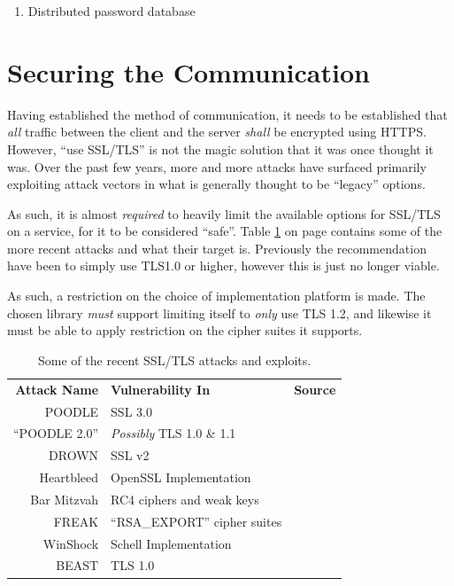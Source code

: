 			\vspace{-3ex}\begin{enumerate}
				\setlength\itemsep{0.1em}
				\item Distributed password database
			\end{enumerate}

	\section{Securing the Communication}
		Having established the method of communication, it needs to be established that \emph{all} traffic between the client and the server \emph{shall} be encrypted using HTTPS. However, ``use SSL/TLS'' is not the magic solution that it was once thought it was. Over the past few years, more and more attacks have surfaced primarily exploiting attack vectors in what is generally thought to be ``legacy'' options.

		As such, it is almost \emph{required} to heavily limit the available options for SSL/TLS on a service, for it to be considered ``safe''. Table \ref{table:ssl/tls} on page \pageref{table:ssl/tls} contains some of the more recent attacks and what their target is. Previously the recommendation have been to simply use TLS1.0 or higher\cite{ms_tls1.0+}, however this is just no longer viable. 

		As such, a restriction on the choice of implementation platform is made. The chosen library \emph{must} support limiting itself to \emph{only} use TLS 1.2, and likewise it must be able to apply restriction on the cipher suites it supports.

		\begin{table}
			\begin{tabular}{r | l | l}
				\textbf{Attack Name}	& \textbf{Vulnerability In}			& \textbf{Source} 						\\
				POODLE  				& SSL 3.0							& \cite{moller2014poodle}				\\
				``POODLE 2.0'' 			& \emph{Possibly} TLS 1.0 \& 1.1 	& \cite{poodlev2,poodlev2_2}			\\
				DROWN 					& SSL v2  							& \cite{aviramdrown}					\\
				Heartbleed 				& OpenSSL Implementation			& \cite{durumeric2014matter}			\\
				Bar Mitzvah 			& RC4 ciphers and weak keys 		& \cite{mantin2015barmitzvah}			\\
				FREAK 					& ``RSA\_EXPORT'' cipher suites 	& \cite[p.3]{novotnyimplementation}		\\
				WinShock 				& Schell Implementation 			& \cite[p.2]{novotnyimplementation} 	\\
				BEAST 					& TLS 1.0 							& \cite{beast} 								\\
			\end{tabular}
			\caption{Some of the recent SSL/TLS attacks and exploits.}
			\label{table:ssl/tls}
		\end{table}


